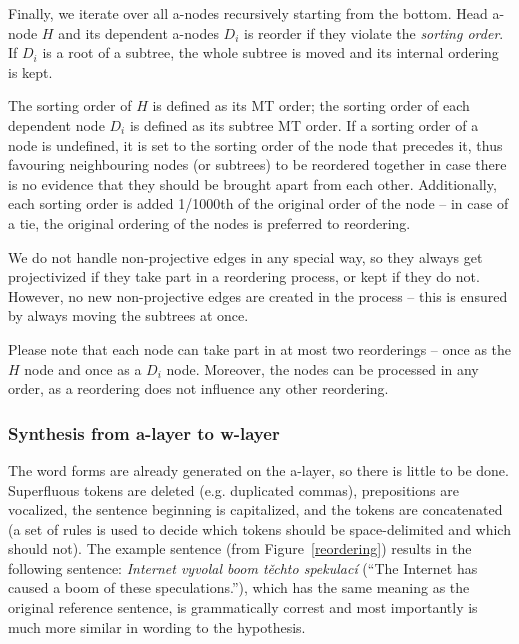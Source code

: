 \documentclass[11pt]{article}
\def\Fref#1{Figure~\ref{#1}}
\begin{document}
Finally, we iterate over all a-nodes recursively starting from the bottom. Head 
a-node $H$ and its dependent a-nodes $D_i$ is reorder if they violate the
\emph{sorting order}. If $D_i$ is a root of a subtree, the whole subtree is 
moved and its internal ordering is kept.

The sorting order of $H$ is defined as its MT order; the sorting order of each 
dependent node $D_i$ is defined as its subtree MT order. If a sorting order of 
a node is undefined, it is set to the sorting order of the node that precedes 
it, thus favouring neighbouring nodes (or subtrees) to be reordered together in 
case there is no evidence that they should be brought apart from each other. 
Additionally, each sorting order is added 1/1000th of the original order of the 
node -- in case of a tie, the original ordering of the nodes is preferred to 
reordering.

We do not handle non-projective edges in any special way, so they always get 
projectivized if they take part in a reordering process, or kept if they do
not. However, no new non-projective edges are created in the process – this is
ensured by always moving the subtrees at once.

Please note that each node can take part in at most two reorderings – once
as the $H$ node and once as a $D_i$ node. Moreover, the nodes can be processed 
in any order, as a reordering does not influence any other reordering.

\subsubsection{Synthesis from a-layer to w-layer}
The word forms are already generated on the a-layer, so there is little to be 
done. Superfluous tokens are deleted (e.g. duplicated commas), prepositions are
vocalized, the sentence beginning is capitalized, and the tokens are 
concatenated (a set of rules is used to decide which tokens should be
space-delimited and which should not).
The example sentence (from \Fref{reordering}) results in the following sentence:
\textit{Internet vyvolal boom těchto spekulací} (``The Internet has caused a boom 
of these speculations.''), which has the same meaning as the original reference 
sentence, is grammatically correst and most importantly is much more similar in
wording to the hypothesis.

\end{document}

